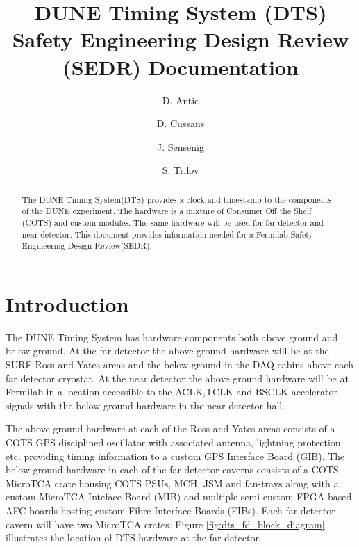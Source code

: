 \documentclass[fleqn,12pt,a4paper]{olplainarticle}
\title{DUNE Timing System (DTS) Safety Engineering Design Review (SEDR) Documentation}
\author[1]{D. Antic}
\author[1]{D. Cussans}
\author[2]{J. Sensenig}
\author[1]{S. Trilov}
\affil[1]{H.H. Wills Physics Laboratory, Bristol, UK}
\affil[2]{David Rittenhouse Laboratory, Philadelphia, USA}
\begin{document}

\begin{abstract}
The DUNE Timing System(DTS) provides a clock and timestamp to the components of the DUNE experiment. The hardware is a mixture of Consumer Off the Shelf (COTS) and custom modules. The same hardware will be used for far detector and near detector. This document provides information needed for a Fermilab Safety Engineering Design Review(SEDR). 
\end{abstract}


\flushbottom

\maketitle

\thispagestyle{empty}

\section{Introduction}

The DUNE Timing System has hardware components both above ground and below ground. At the far detector the above ground hardware will be at the SURF Ross and Yates areas and the below ground in the DAQ cabins above each far detector cryostat. At the near detector the above ground hardware will be at Fermilab in a location accessible to the ACLK,TCLK and BSCLK accelerator signals with the below ground hardware in the near detector hall.

The above ground hardware at each of the Ross and Yates areas consists of a COTS GPS disciplined oscillator with associated antenna, lightning protection etc. providing timing information to a custom GPS Interface Board (GIB). The below ground hardware in each of the far detector caverns consists of a COTS MicroTCA crate housing COTS PSUs, MCH, JSM and fan-trays along with a custom MicroTCA Inteface Board (MIB) and multiple semi-custom FPGA based AFC boards hosting custom Fibre Interface Boards (FIBs). Each far detector cavern will have two MicroTCA crates.
Figure \ref{fig:dts_fd_block_diagram} illustrates the location of DTS hardware at the far detector.
\end{document}
